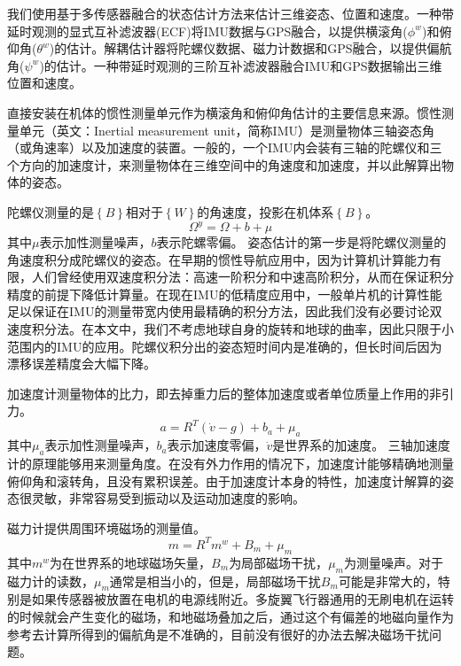 \documentclass[
  type=master
]{gdutthesis}
\begin{document}
我们使用基于多传感器融合的状态估计方法来估计三维姿态、位置和速度。一种带延时观测的显式互补滤波器(ECF)将IMU数据与GPS融合，以提供横滚角($\phi^w$)和俯仰角($\theta^w$)的估计。解耦估计器将陀螺仪数据、磁力计数据和GPS融合，以提供偏航角($\psi^w$)的估计。一种带延时观测的三阶互补滤波器融合IMU和GPS数据输出三维位置和速度。

直接安装在机体的惯性测量单元作为横滚角和俯仰角估计的主要信息来源。惯性测量单元（英文：Inertial measurement unit，简称IMU）是测量物体三轴姿态角（或角速率）以及加速度的装置。一般的，一个IMU内会装有三轴的陀螺仪和三个方向的加速度计，来测量物体在三维空间中的角速度和加速度，并以此解算出物体的姿态。

陀螺仪测量的是$\left\{ B \right\}$相对于$\left\{ W \right\}$的角速度，投影在机体系$\left\{ B \right\}$。
\begin{equation}\label{eq:gyromodel}
	\Omega^y=\Omega+b+\mu
\end{equation}
其中$\mu$表示加性测量噪声，$b$表示陀螺零偏。
姿态估计的第一步是将陀螺仪测量的角速度积分成陀螺仪的姿态。在早期的惯性导航应用中，因为计算机计算能力有限，人们曾经使用双速度积分法：高速一阶积分和中速高阶积分，从而在保证积分精度的前提下降低计算量\cite{savage1998strapdown}。在现在IMU的低精度应用中，一般单片机的计算性能足以保证在IMU的测量带宽内使用最精确的积分方法，因此我们没有必要讨论双速度积分法。在本文中，我们不考虑地球自身的旋转和地球的曲率，因此只限于小范围内的IMU的应用。陀螺仪积分出的姿态短时间内是准确的，但长时间后因为漂移误差精度会大幅下降\cite{钱华明2010基于}。

加速度计测量物体的比力，即去掉重力后的整体加速度或者单位质量上作用的非引力。
\begin{equation}\label{eq:accmodel}
	a=R^T(\dot{v}-g)+b_a+\mu_a
\end{equation}
其中$\mu_a$表示加性测量噪声，$b_a$表示加速度零偏，$\dot{v}$是世界系的加速度。
三轴加速度计的原理能够用来测量角度。在没有外力作用的情况下，加速度计能够精确地测量俯仰角和滚转角，且没有累积误差。由于加速度计本身的特性，加速度计解算的姿态很灵敏，非常容易受到振动以及运动加速度的影响\cite{赵翔2012基于}。

磁力计提供周围环境磁场的测量值。
\begin{equation}\label{eq:magmodel}
	m=R^T m^w+B_m+\mu_m
\end{equation}
其中$m^w$为在世界系的地球磁场矢量，$B_m$为局部磁场干扰，$\mu_m$为测量噪声。对于磁力计的读数，$\mu_m$通常是相当小的，但是，局部磁场干扰$B_m$可能是非常大的，特别是如果传感器被放置在电机的电源线附近。多旋翼飞行器通用的无刷电机在运转的时候就会产生变化的磁场，和地磁场叠加之后，通过这个有偏差的地磁向量作为参考去计算所得到的偏航角是不准确的，目前没有很好的办法去解决磁场干扰问题\cite{梅玲玉2019基于}。
\end{document}
